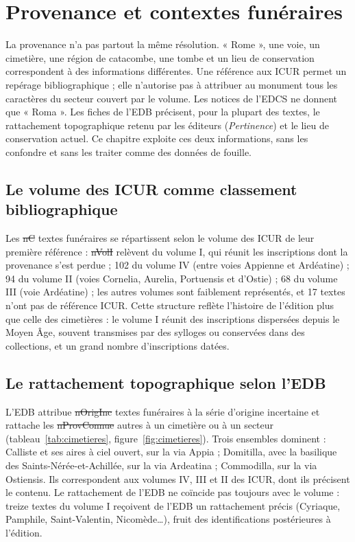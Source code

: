 \chapter{Provenance et contextes funéraires}\label{ch:provenance}

La provenance n’a pas partout la même résolution. « Rome », une voie, un cimetière, une région de catacombe, une tombe et un lieu de conservation correspondent à des informations différentes. Une référence aux ICUR permet un repérage bibliographique ; elle n’autorise pas à attribuer au monument tous les caractères du secteur couvert par le volume. Les notices de l’EDCS ne donnent que « Roma ». Les fiches de l’EDB précisent, pour la plupart des textes, le rattachement topographique retenu par les éditeurs (\emph{Pertinence}) et le lieu de conservation actuel. Ce chapitre exploite ces deux informations, sans les confondre et sans les traiter comme des données de fouille.

\section{Le volume des ICUR comme classement bibliographique}

Les \st{nC} textes funéraires se répartissent selon le volume des ICUR de leur première référence : \st{nVolI} relèvent du volume I, qui réunit les inscriptions dont la provenance s’est perdue ; 102 du volume IV (entre voies Appienne et Ardéatine) ; 94 du volume II (voies Cornelia, Aurelia, Portuensis et d’Ostie) ; 68 du volume III (voie Ardéatine) ; les autres volumes sont faiblement représentés, et 17 textes n’ont pas de référence ICUR. Cette structure reflète l’histoire de l’édition plus que celle des cimetières : le volume I réunit des inscriptions dispersées depuis le Moyen Âge, souvent transmises par des sylloges ou conservées dans des collections, et un grand nombre d’inscriptions datées.

\section{Le rattachement topographique selon l’EDB}

L’EDB attribue \st{nOrigInc} textes funéraires à la série d’origine incertaine et rattache les \st{nProvConnue} autres à un cimetière ou à un secteur (tableau~\ref{tab:cimetieres}, figure~\ref{fig:cimetieres}). Trois ensembles dominent : Calliste et ses aires à ciel ouvert, sur la via Appia ; Domitilla, avec la basilique des Saints-Nérée-et-Achillée, sur la via Ardeatina ; Commodilla, sur la via Ostiensis. Ils correspondent aux volumes IV, III et II des ICUR, dont ils précisent le contenu. Le rattachement de l’EDB ne coïncide pas toujours avec le volume : treize textes du volume I reçoivent de l’EDB un rattachement précis (Cyriaque, Pamphile, Saint-Valentin, Nicomède…), fruit des identifications postérieures à l’édition.

